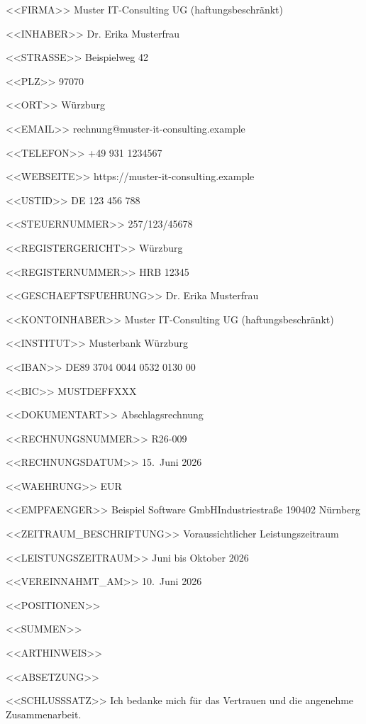 <<FIRMA>>
Muster IT-Consulting UG (haftungsbeschränkt)

<<INHABER>>
Dr. Erika Musterfrau

<<STRASSE>>
Beispielweg 42

<<PLZ>>
97070

<<ORT>>
Würzburg

<<EMAIL>>
rechnung@muster-it-consulting.example

<<TELEFON>>
+49 931 1234567

<<WEBSEITE>>
https://muster-it-consulting.example

<<USTID>>
DE 123 456 788

<<STEUERNUMMER>>
257/123/45678

<<REGISTERGERICHT>>
Würzburg

<<REGISTERNUMMER>>
HRB 12345

<<GESCHAEFTSFUEHRUNG>>
Dr. Erika Musterfrau

<<KONTOINHABER>>
Muster IT-Consulting UG (haftungsbeschränkt)

<<INSTITUT>>
Musterbank Würzburg

<<IBAN>>
DE89 3704 0044 0532 0130 00

<<BIC>>
MUSTDEFFXXX

<<DOKUMENTART>>
Abschlagsrechnung

<<RECHNUNGSNUMMER>>
R26-009

<<RECHNUNGSDATUM>>
15.~Juni 2026

<<WAEHRUNG>>
EUR

<<EMPFAENGER>>
Beispiel Software GmbH\zeilenwechsel{}Industriestraße 1\zeilenwechsel{}90402 Nürnberg

<<ZEITRAUM_BESCHRIFTUNG>>
Voraussichtlicher Leistungszeitraum

<<LEISTUNGSZEITRAUM>>
Juni bis Oktober 2026

<<VEREINNAHMT_AM>>
10.~Juni 2026

<<POSITIONEN>>

<<SUMMEN>>
   \summentrenner{}

<<ARTHINWEIS>>

<<ABSETZUNG>>

<<SCHLUSSSATZ>>
Ich bedanke mich für das Vertrauen und die angenehme Zusammenarbeit.
